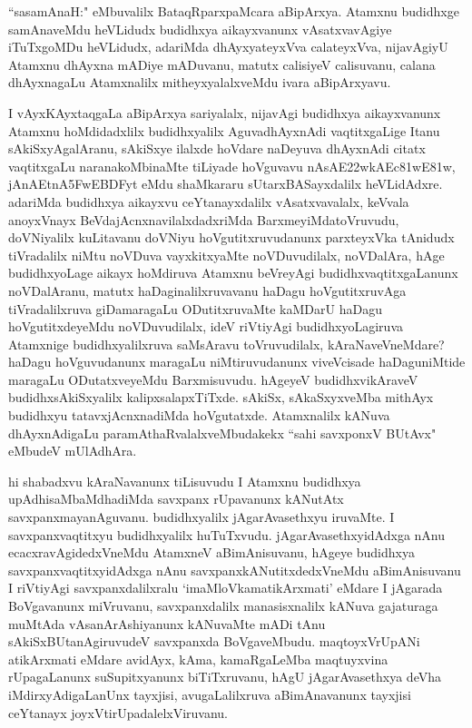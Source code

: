 \begin{artha}
``sasamAnaH:" eMbuvalilx BataqRparxpaMcara aBipArxya. Atamxnu budidhxge samAnaveMdu heVLidudx budidhxya aikayxvanunx vAsatxvavAgiye iTuTxgoMDu heVLidudx, adariMda dhAyxyateyxVva calateyxVva, nijavAgiyU Atamxnu dhAyxna mADiye mADuvanu, matutx calisiyeV calisuvanu, calana dhAyxnagaLu Atamxnalilx mitheyxyalalxveMdu ivara aBipArxyavu.

I vAyxKAyxtaqgaLa aBipArxya sariyalalx, nijavAgi budidhxya aikayxvanunx Atamxnu hoMdidadxlilx budidhxyalilx AguvadhAyxnAdi vaqtitxgaLige Itanu sAkiSxyAgalAranu, sAkiSxye ilalxde hoVdare naDeyuva dhAyxnAdi citatx vaqtitxgaLu naranakoMbinaMte tiLiyade hoVguvavu {\dn nAsAE\322wkAEc\381wE\381w,  jAnAEtnA\35FwEBDFyt\?} eMdu shaMkararu sUtarxBASayxdalilx heVLidAdxre. adariMda budidhxya aikayxvu ceYtanayxdalilx vAsatxvavalalx, keVvala anoyxVnayx BeVdajAcnxnavilalxdadxriMda BarxmeyiMda\break toVruvudu, doVNiyalilx kuLitavanu doVNiyu hoVgutitxruvudanunx parxteyxVka tAnidudx tiVradalilx niMtu noVDuva vayxkitxyaMte noVDuvudilalx, noVDalAra, hAge budidhxyoLage aikayx hoMdiruva Atamxnu beVreyAgi budidhxvaqtitxgaLanunx noVDalAranu, matutx haDaginalilxruvavanu haDagu hoVgutitxruvAga tiVradalilxruva giDamaragaLu ODutitxruvaMte kaMDarU haDagu hoVgutitxdeyeMdu noVDuvudilalx, ideV riVtiyAgi budidhxyoLagiruva Atamxnige budidhxyalilxruva saMsAravu toVruvudilalx, kAraNaveVneMdare? haDagu hoVguvudanunx maragaLu niMtiruvudanunx viveVcisade haDaguniMtide maragaLu ODutatxveyeMdu Barxmisuvudu. hAgeyeV budidhxvikAraveV budidhxsAkiSxyalilx kalipxsalapxTiTxde. sAkiSx, sAkaSxyxveMba mithAyx budidhxyu tatavxjAcnxnadiMda hoVgutatxde. Atamxnalilx kANuva dhAyxnAdigaLu paramAthaRvalalxveMbudakekx ``sahi savxponxV BUtAvx" eMbudeV mUlAdhAra. 
\end{artha}


\begin{artha}
hi shabadxvu kAraNavanunx tiLisuvudu I Atamxnu budidhxya upAdhisaMbaMdhadiMda savxpanx rUpavanunx kANutAtx savxpanxmayanAguvanu. budidhxyalilx jAgarAvasethxyu iruvaMte. I savxpanxvaqtitxyu budidhxyalilx huTuTxvudu. jAgarAvasethxyidAdxga nAnu ecacxravAgidedxVneMdu AtamxneV aBimAnisuvanu, hAgeye budidhxya savxpanxvaqtitxyidAdxga nAnu savxpanxkANutitxdedxVneMdu aBimAnisuvanu I riVtiyAgi savxpanxdalilxralu `imaMloVkamatikArxmati' eMdare I jAgarada BoVgavanunx miVruvanu, savxpanxdalilx manasisxnalilx kANuva gajaturaga muMtAda vAsanArAshiyanunx kANuvaMte mADi tAnu sAkiSxBUtanAgiruvudeV savxpanxda BoVgaveMbudu. maqtoyxVrUpANi atikArxmati eMdare avidAyx, kAma, kamaRgaLeMba maqtuyxvina rUpagaLanunx suSupitxyanunx biTiTxruvanu, hAgU jAgarAvasethxya deVha iMdirxyAdigaLanUnx tayxjisi, avugaLalilxruva aBimAnavanunx tayxjisi ceYtanayx joyxVtirUpadalelxV\break iruvanu.
\end{artha}

